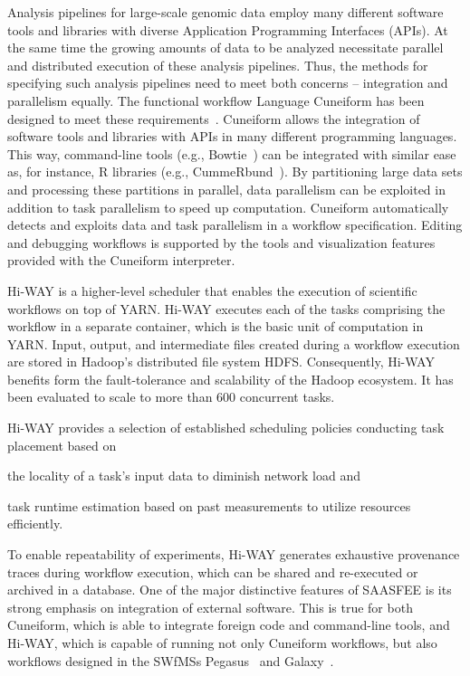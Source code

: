 Analysis pipelines for large-scale genomic data employ many different software tools and libraries with diverse Application Programming Interfaces (APIs). At the same time the growing amounts of data to be analyzed necessitate parallel and distributed execution of these analysis pipelines. Thus, the methods for specifying such analysis pipelines need to meet both concerns -- integration and parallelism equally. The functional workflow Language Cuneiform has been designed to meet these requirements~\cite{Brandt2015}. Cuneiform allows the integration of software tools and libraries with APIs in many different programming languages. This way, command-line tools (e.g., Bowtie~\cite{langmead2009ultrafast}) can be integrated with similar ease as, for instance, R libraries (e.g., CummeRbund~\cite{goff2012cummerbund}). By partitioning large data sets and processing these partitions in parallel, data parallelism can be exploited in addition to task parallelism to speed up computation. Cuneiform automatically detects and exploits data and task parallelism in a workflow specification. Editing and debugging workflows is supported by the tools and visualization features provided with the Cuneiform interpreter.

Hi-WAY is a higher-level scheduler that enables the execution of scientific workflows on top of YARN. Hi-WAY executes each of the tasks comprising the workflow in a separate container, which is the basic unit of computation in YARN. Input, output, and intermediate files created during a workflow execution are stored in Hadoop's distributed file system HDFS. Consequently, Hi-WAY benefits form the fault-tolerance and scalability of the Hadoop ecosystem. It has been evaluated to scale to more than 600 concurrent tasks.

Hi-WAY provides a selection of established scheduling policies conducting task placement based on
\begin{inparaenum}[(a)]
  \item the locality of a task's input data to diminish network load and
  \item task runtime estimation based on past measurements to utilize resources efficiently.
\end{inparaenum}
To enable repeatability of experiments, Hi-WAY generates exhaustive provenance traces during workflow execution, which can be shared and re-executed or archived in a database. One of the major distinctive features of SAASFEE is its strong emphasis on integration of external software. This is true for both Cuneiform, which is able to integrate foreign code and command-line tools, and Hi-WAY, which is capable of running not only Cuneiform workflows, but also workflows designed in the SWfMSs Pegasus~\cite{pegasus_fgcs} and Galaxy~\cite{Goecks10}.


